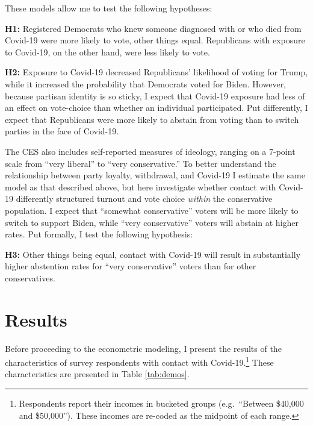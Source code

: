 \documentclass[
  12pt,
]{article}
\begin{document}
These models allow me to test the following hypotheses:

\textbf{H1:} Registered Democrats who knew someone diagnosed with or who died from Covid-19 were more likely to vote, other things equal. Republicans with exposure to Covid-19, on the other hand, were less likely to vote.

\textbf{H2:} Exposure to Covid-19 decreased Republicans' likelihood of voting for Trump, while it increased the probability that Democrats voted for Biden. However, because partisan identity is so sticky, I expect that Covid-19 exposure had less of an effect on vote-choice than whether an individual participated. Put differently, I expect that Republicans were more likely to abstain from voting than to switch parties in the face of Covid-19.

The CES also includes self-reported measures of ideology, ranging on a 7-point scale from ``very liberal'' to ``very conservative.'' To better understand the relationship between party loyalty, withdrawal, and Covid-19 I estimate the same model as that described above, but here investigate whether contact with Covid-19 differently structured turnout and vote choice \emph{within} the conservative population. I expect that ``somewhat conservative'' voters will be more likely to switch to support Biden, while ``very conservative'' voters will abstain at higher rates. Put formally, I test the following hypothesis:

\textbf{H3:} Other things being equal, contact with Covid-19 will result in substantially higher abstention rates for ``very conservative'' voters than for other conservatives.

\hypertarget{results}{%
\section*{Results}\label{results}}

Before proceeding to the econometric modeling, I present the results of the characteristics of survey respondents with contact with Covid-19.\footnote{Respondents report their incomes in bucketed groups (e.g.~``Between \$40,000 and \$50,000''). These incomes are re-coded as the midpoint of each range.} These characteristics are presented in Table \ref{tab:demos}.
\end{document}
